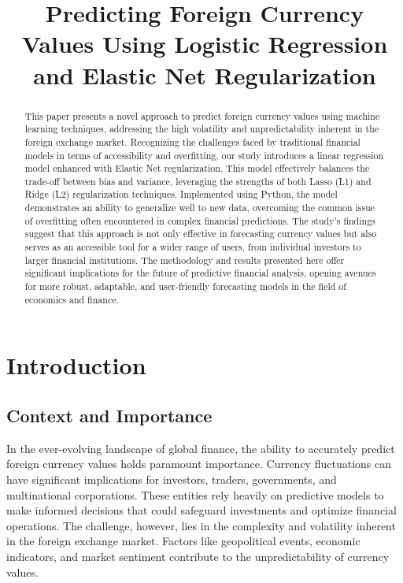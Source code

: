 \documentclass[conference]{IEEEtran}
\begin{document}
\title{Predicting Foreign Currency Values Using Logistic Regression and Elastic Net Regularization}

\author{
}

\maketitle

\begin{abstract}
    This paper presents a novel approach to predict foreign currency values using machine learning techniques, addressing the high volatility and unpredictability inherent in the foreign exchange market. Recognizing the challenges faced by traditional financial models in terms of accessibility and overfitting, our study introduces a linear regression model enhanced with Elastic Net regularization. This model effectively balances the trade-off between bias and variance, leveraging the strengths of both Lasso (L1) and Ridge (L2) regularization techniques. Implemented using Python, the model demonstrates an ability to generalize well to new data, overcoming the common issue of overfitting often encountered in complex financial predictions. The study's findings suggest that this approach is not only effective in forecasting currency values but also serves as an accessible tool for a wider range of users, from individual investors to larger financial institutions. The methodology and results presented here offer significant implications for the future of predictive financial analysis, opening avenues for more robust, adaptable, and user-friendly forecasting models in the field of economics and finance.
\end{abstract}

\section{Introduction}
\subsection{Context and Importance}
In the ever-evolving landscape of global finance, the ability to accurately predict foreign currency values holds paramount importance. Currency fluctuations can have significant implications for investors, traders, governments, and multinational corporations. These entities rely heavily on predictive models to make informed decisions that could safeguard investments and optimize financial operations. The challenge, however, lies in the complexity and volatility inherent in the foreign exchange market. Factors like geopolitical events, economic indicators, and market sentiment contribute to the unpredictability of currency values.
\end{document}
